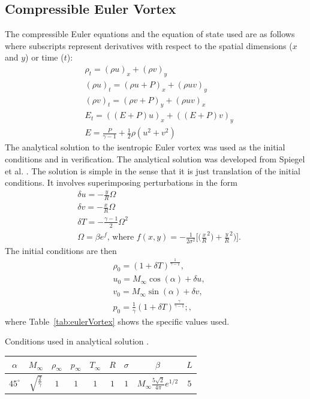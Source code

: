 \documentclass[mca,article,submit,moreauthors,pdftex]{Definitions/mdpi}
\begin{document}
\begin{paracol}{2}
\section{Compressible Euler Vortex}
\label{Compressible-Euler}
The compressible Euler equations and the equation of state used are as follows where subscripts represent derivatives with respect to the spatial dimensions ($x$ and $y$) or time ($t$):
\begin{align*}
    &\rho_t  = (\rho u)_x + (\rho v)_y \\ 
    &(\rho u)_t  = (\rho u+P)_x + (\rho u v)_y\\
    &(\rho v)_t  = (\rho v+P)_y + (\rho u v)_x\\
    &E_t = ((E+P)u)_x+((E+P)v)_y\\
    &E = \frac{P}{\gamma -1}+\frac{1}{2}\rho(u^2+v^2)
\end{align*}
The analytical solution to the isentropic Euler vortex was used as the initial conditions and in verification. The analytical solution was developed from Spiegel et al. \cite{spiegel_survey_2015}. The solution is simple in the sense that it is just translation of the initial conditions. It involves superimposing perturbations in the form
\begin{align*}
    &\delta u = -\frac{y}{R}\Omega\\
    &\delta v = -\frac{x}{R}\Omega\\
    &\delta T = -\frac{\gamma-1}{2} \Omega^2\\
    &\Omega = \beta e^{f}\text{, where } f(x,y) = -\frac{1}{2\sigma^2}\Bigg[\bigg(\frac{x}{R}^2\bigg)+\frac{y}{R}^2\bigg)\Bigg].
\end{align*}
The initial conditions are then 
\begin{align*}
    &\rho_0 = (1+\delta T)^{\frac{1}{\gamma-1}},\\
    &u_0 = M_\infty \cos(\alpha)+\delta u,\\
    &v_0 = M_\infty \sin(\alpha)+\delta v,\\
    &p_0 = \frac{1}{\gamma}(1+\delta T)^\frac{\gamma}{\gamma-1} ;,
\end{align*}
where Table~\ref{tab:eulerVortex} shows the specific values used.

\begin{specialtable}[H]
    \caption{Conditions used in analytical solution \cite{shu_essentially_1998}.}
    \label{tab:eulerVortex}
    \begin{tabular}{@{}ccccccccc@{}}
    \toprule
    $\alpha$ & $M_\infty$  & $\rho_\infty$ & $p_\infty$ & $T_\infty$ & $R$ & $\sigma$ & $\beta$ & $L$ \\ 
    \midrule
    $45^\circ$ &  $\sqrt{\frac{2}{\gamma}}$ & $1$ & $1$ & $1$ & $1$ & $1$ & $M_\infty \frac{5\sqrt{2}}{4\pi}e^{1/2}$ & $5$\\
    \bottomrule
    \end{tabular}
\end{specialtable}


\end{paracol}
\end{document}
